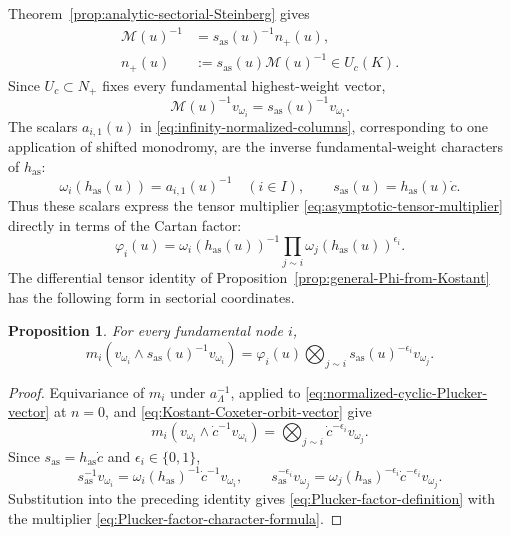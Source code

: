 \documentclass[11pt,leqno]{amsart}
\numberwithin{equation}{section}
\theoremstyle{plain}
\newtheorem{proposition}[theorem]{Proposition}
\theoremstyle{definition}
\theoremstyle{plain}
\theoremstyle{definition}
\theoremstyle{remark}
\begin{document}
Theorem~\ref{prop:analytic-sectorial-Steinberg} gives
\begin{equation}\label{eq:asymptotic-pullback-unipotent}
 \begin{aligned}
 \mathscr M(u)^{-1}&=s_{\mathrm{as}}(u)^{-1}n_+(u),\\
 n_+(u)&:=s_{\mathrm{as}}(u)\mathscr M(u)^{-1}\in U_c(K).
 \end{aligned}
\end{equation}
Since $U_c\subset N_+$ fixes every fundamental highest-weight vector,
\begin{equation}\label{eq:infinity-first-column}
 \mathscr M(u)^{-1}v_{\omega_i}=s_{\mathrm{as}}(u)^{-1}v_{\omega_i}.
\end{equation}
The scalars $a_{i,1}(u)$ in \eqref{eq:infinity-normalized-columns}, corresponding to one application of shifted monodromy, are the inverse fundamental-weight characters of $h_{\mathrm{as}}$:
\begin{equation}\label{eq:intrinsic-Cartan-normalization}
 \omega_i(h_{\mathrm{as}}(u))=a_{i,1}(u)^{-1}\quad(i\in I),\qquad
 s_{\mathrm{as}}(u)=h_{\mathrm{as}}(u)\dot c.
\end{equation}
Thus these scalars express the tensor multiplier \eqref{eq:asymptotic-tensor-multiplier} directly in terms of the Cartan factor:
\begin{equation}\label{eq:Plucker-factor-character-formula}
 \varphi_i(u)=\omega_i(h_{\mathrm{as}}(u))^{-1}
                 \prod_{j\sim i}\omega_j(h_{\mathrm{as}}(u))^{\epsilon_i}.
\end{equation}
The differential tensor identity of Proposition~\ref{prop:general-Phi-from-Kostant} has the following form in sectorial coordinates.
\begin{proposition}\label{prop:sectorial-Plucker-identity}
For every fundamental node $i$,
\begin{equation}\label{eq:Plucker-factor-definition}
 m_i(v_{\omega_i}\wedge s_{\mathrm{as}}(u)^{-1}v_{\omega_i})
 =\varphi_i(u)\bigotimes_{j\sim i}s_{\mathrm{as}}(u)^{-\epsilon_i}v_{\omega_j}.
\end{equation}
\end{proposition}
\begin{proof}
Equivariance of $m_i$ under $a_\Lambda^{-1}$, applied to \eqref{eq:normalized-cyclic-Plucker-vector} at $n=0$, and \eqref{eq:Kostant-Coxeter-orbit-vector} give
\[
 m_i(v_{\omega_i}\wedge\dot c^{-1}v_{\omega_i})
 =\bigotimes_{j\sim i}\dot c^{-\epsilon_i}v_{\omega_j}.
\]
Since $s_{\mathrm{as}}=h_{\mathrm{as}}\dot c$ and $\epsilon_i\in\{0,1\}$,
\[
 s_{\mathrm{as}}^{-1}v_{\omega_i}
 =\omega_i(h_{\mathrm{as}})^{-1}\dot c^{-1}v_{\omega_i},
 \qquad
 s_{\mathrm{as}}^{-\epsilon_i}v_{\omega_j}
 =\omega_j(h_{\mathrm{as}})^{-\epsilon_i}
      \dot c^{-\epsilon_i}v_{\omega_j}.
\]
Substitution into the preceding identity gives \eqref{eq:Plucker-factor-definition} with the multiplier \eqref{eq:Plucker-factor-character-formula}.
\end{proof}
\end{document}
